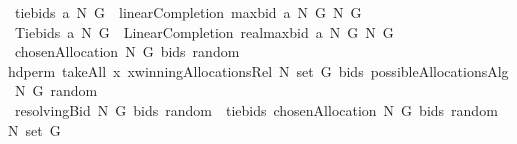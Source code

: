 \begin{isabellebody}
\isamarkupfalse%
\ {\isachardoublequoteopen}tiebids{\isacharprime}\ a\ N\ G\ {\isacharequal}{\isacharequal}\ linearCompletion{\isacharprime}\ {\isacharparenleft}maxbid{\isacharprime}\ a\ N\ G{\isacharparenright}\ N\ G{\isachardoublequoteclose}\isanewline
{}\isamarkupfalse%
\ {\isachardoublequoteopen}Tiebids\ a\ N\ G\ {\isacharequal}{\isacharequal}\ LinearCompletion\ {\isacharparenleft}real{\isasymcirc}maxbid{\isacharprime}\ a\ N\ G{\isacharparenright}\ N\ G{\isachardoublequoteclose}\isanewline
{}\isamarkupfalse%
\ {\isachardoublequoteopen}chosenAllocation{\isacharprime}\ N\ G\ bids\ random\ {\isacharequal}{\isacharequal}\ \isanewline
hd{\isacharparenleft}perm{}\ {\isacharparenleft}takeAll\ {\isacharparenleft}{\isacharpercent}x{\isachardot}\ x{\isasymin}{\isacharparenleft}winningAllocationsRel\ N\ {\isacharparenleft}set\ G{\isacharparenright}\ bids{\isacharparenright}{\isacharparenright}\ {\isacharparenleft}possibleAllocationsAlg{}\ N\ G{\isacharparenright}{\isacharparenright}\ random{\isacharparenright}{\isachardoublequoteclose}\isanewline
{}\isamarkupfalse%
\ {\isachardoublequoteopen}resolvingBid{\isacharprime}\ N\ G\ bids\ random\ {\isacharequal}{\isacharequal}\ tiebids{\isacharprime}\ {\isacharparenleft}chosenAllocation{\isacharprime}\ N\ G\ bids\ random{\isacharparenright}\ N\ {\isacharparenleft}set\ G{\isacharparenright}{\isachardoublequoteclose}\isanewline
%
\isadelimtheory
\isanewline
%
\endisadelimtheory
%
\isatagtheory
{}\isamarkupfalse%
%
\endisatagtheory
{\isafoldtheory}%
%
\isadelimtheory
%
\endisadelimtheory
\end{isabellebody}%
